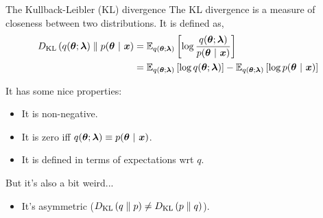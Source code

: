 \documentclass[aspectratio=169]{beamer}
\begin{document}
    
    
\begin{frame}{The Kullback-Leibler (KL) divergence}
    The KL divergence is a measure of closeness between two distributions. It is defined as,
    \begin{align*}
        D_{\textrm{KL}}\left(q(\boldsymbol{\theta}; \boldsymbol{\lambda})\;\|\;p(\boldsymbol{\theta} ~\vert~ \boldsymbol{x}\right) &= \mathbb{E}_{q(\boldsymbol{\theta}; \boldsymbol{\lambda})} \left[ \log \frac{q(\boldsymbol{\theta}; \boldsymbol{\lambda})}{p(\boldsymbol{\theta} ~\vert~ \boldsymbol{x})} \right] \\
        &= \mathbb{E}_{q(\boldsymbol{\theta}; \boldsymbol{\lambda})} \left[ \log q(\boldsymbol{\theta}; \boldsymbol{\lambda}) \right] 
        - \mathbb{E}_{q(\boldsymbol{\theta}; \boldsymbol{\lambda})} \left[ \log p(\boldsymbol{\theta} ~\vert~ \boldsymbol{x}) \right] 
    \end{align*}
    
    It has some nice properties:
    \begin{itemize}
        \item It is non-negative.
        
        \item It is zero iff $q(\boldsymbol{\theta}; \boldsymbol{\lambda}) \equiv p(\boldsymbol{\theta} ~\vert~ \boldsymbol{x})$.
        
        \item It is defined in terms of expectations wrt $q$.
    \end{itemize}
    
    But it's also a bit weird... 
    \begin{itemize}
        \item It's asymmetric ($D_{\textrm{KL}}\left(q\;\|\;p\right) \neq D_{\textrm{KL}}\left(p\;\|\;q\right)$).
    \end{itemize}
\end{frame}
    
\end{document}

